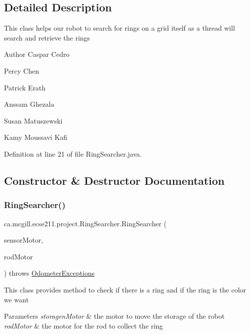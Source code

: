 \subsection{Detailed Description}
This class helps our robot to search for rings on a grid itself as a thread will search and retrieve the rings

\begin{DoxyAuthor}{Author}
Caspar Cedro 

Percy Chen 

Patrick Erath 

Anssam Ghezala 

Susan Matuszewski 

Kamy Moussavi Kafi 
\end{DoxyAuthor}


Definition at line 21 of file Ring\+Searcher.\+java.



\subsection{Constructor \& Destructor Documentation}
\mbox{\label{classca_1_1mcgill_1_1ecse211_1_1project_1_1_ring_searcher_a37eebb6cbdfd692e0979c3ca0fe2597b}} 
\subsubsection{\texorpdfstring{Ring\+Searcher()}{RingSearcher()}}
{\footnotesize\ttfamily ca.\+mcgill.\+ecse211.\+project.\+Ring\+Searcher.\+Ring\+Searcher (\begin{DoxyParamCaption}\item[{E\+V3\+Large\+Regulated\+Motor}]{sensor\+Motor,  }\item[{E\+V3\+Large\+Regulated\+Motor}]{rod\+Motor }\end{DoxyParamCaption}) throws \hyperlink{classca_1_1mcgill_1_1ecse211_1_1odometer_1_1_odometer_exceptions}{Odometer\+Exceptions}}

This class provides method to check if there is a ring and if the ring is the color we want


\begin{DoxyParams}{Parameters}
{\em storagen\+Motor} & the motor to move the storage of the robot \\
\hline
{\em rod\+Motor} & the motor for the rod to collect the ring \\
\hline
\end{DoxyParams}

